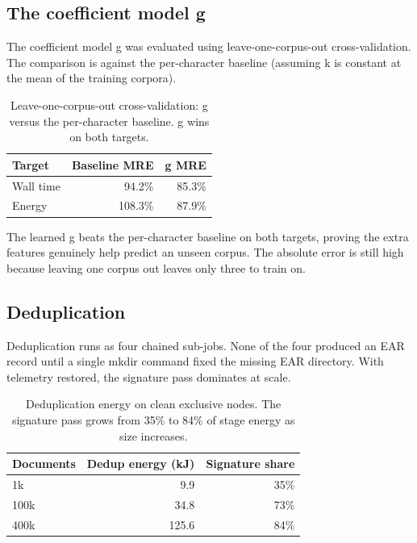 \documentclass[12pt,a4paper]{article}
\begin{document}
\subsection{The coefficient model g}

The coefficient model g was evaluated using leave-one-corpus-out cross-validation. The comparison is against the per-character baseline (assuming k is constant at the mean of the training corpora).

\begin{table}[ht]
\centering
\begin{tabular}{lrr}
\toprule
Target & Baseline MRE & g MRE \\
\midrule
Wall time & 94.2\% & 85.3\% \\
Energy & 108.3\% & 87.9\% \\
\bottomrule
\end{tabular}
\caption{Leave-one-corpus-out cross-validation: g versus the per-character baseline. g wins on both targets.}
\label{tab:g}
\end{table}

The learned g beats the per-character baseline on both targets, proving the extra features genuinely help predict an unseen corpus. The absolute error is still high because leaving one corpus out leaves only three to train on.

\subsection{Deduplication}

Deduplication runs as four chained sub-jobs. None of the four produced an EAR record until a single mkdir command fixed the missing EAR directory. With telemetry restored, the signature pass dominates at scale.

\begin{table}[ht]
\centering
\begin{tabular}{lrr}
\toprule
Documents & Dedup energy (kJ) & Signature share \\
\midrule
1k & 9.9 & 35\% \\
100k & 34.8 & 73\% \\
400k & 125.6 & 84\% \\
\bottomrule
\end{tabular}
\caption{Deduplication energy on clean exclusive nodes. The signature pass grows from 35\% to 84\% of stage energy as size increases.}
\label{tab:dedup}
\end{table}
\end{document}
